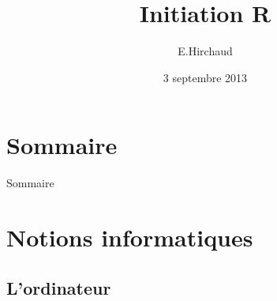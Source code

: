 \documentclass{beamer}
\title{Initiation R}
\institute{BiRD}
\date{3 septembre 2013}
\author{E.Hirchaud}
\begin{document}
\begin{frame}
	\titlepage
\end{frame}


\section*{Sommaire}
\begin{frame}{Sommaire}
		\small \tableofcontents
\end{frame}
		
\section{Notions informatiques}
	\subsection{L'ordinateur}
\end{document}
